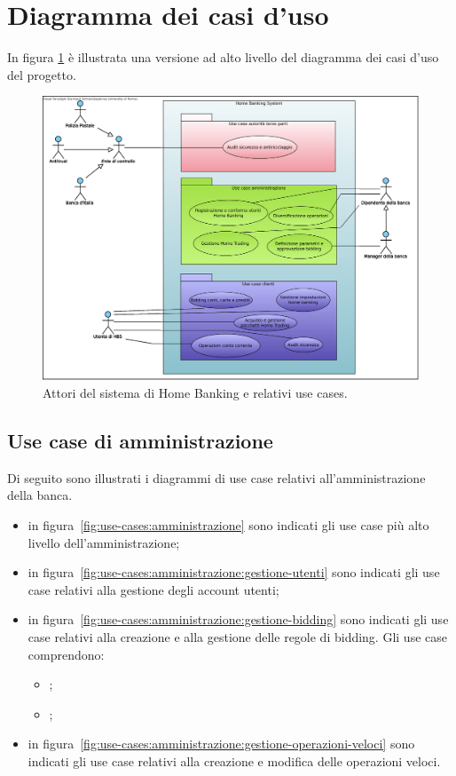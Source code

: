 \section{Diagramma dei casi d'uso}

In figura \ref{fig:use-cases} \`e illustrata una versione ad alto livello del diagramma dei casi d'uso del progetto.

\begin{figure}
	\centering
	\includegraphics[width=\textwidth]{Images/Home_Banking_inception_use_cases.eps}
	\caption{Attori del sistema di Home Banking e relativi use cases.}
	\label{fig:use-cases}
\end{figure}

\subsection{Use case di amministrazione}

Di seguito sono illustrati i diagrammi di use case relativi all'amministrazione della banca.

\begin{itemize}
	\item in figura~\ref{fig:use-cases:amministrazione} sono indicati gli use case più alto livello dell'amministrazione;

	\item in figura~\ref{fig:use-cases:amministrazione:gestione-utenti} sono indicati gli use case relativi alla gestione degli account utenti;

	\item in figura~\ref{fig:use-cases:amministrazione:gestione-bidding} sono indicati gli use case relativi alla creazione e alla gestione delle regole di bidding.
	Gli use case comprendono:
	\begin{itemize}
		\item \hyperref[sec:use-case:CREABID]{\iducCREABID};
		\item \hyperref[sec:use-case:BIDVIS]{\iducBIDVIS};
	\end{itemize}

	\item in figura~\ref{fig:use-cases:amministrazione:gestione-operazioni-veloci} sono indicati gli use case relativi alla creazione e modifica delle operazioni veloci.
\end{itemize}

